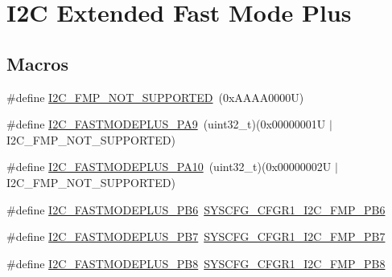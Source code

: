 \hypertarget{group___i2_c_ex___fast_mode_plus}{}\section{I2C Extended Fast Mode Plus}
\label{group___i2_c_ex___fast_mode_plus}
\subsection*{Macros}
\begin{DoxyCompactItemize}
\item 
\#define \hyperlink{group___i2_c_ex___fast_mode_plus_ga3a3da061fa78faa209f0feb39e20ef43}{I2\+C\+\_\+\+F\+M\+P\+\_\+\+N\+O\+T\+\_\+\+S\+U\+P\+P\+O\+R\+T\+ED}~(0x\+A\+A\+A\+A0000\+U)
\item 
\#define \hyperlink{group___i2_c_ex___fast_mode_plus_ga2e335d4993c228bb7aa778890e29ce57}{I2\+C\+\_\+\+F\+A\+S\+T\+M\+O\+D\+E\+P\+L\+U\+S\+\_\+\+P\+A9}~(uint32\+\_\+t)(0x00000001\+U $\vert$ I2\+C\+\_\+\+F\+M\+P\+\_\+\+N\+O\+T\+\_\+\+S\+U\+P\+P\+O\+R\+T\+E\+D)
\item 
\#define \hyperlink{group___i2_c_ex___fast_mode_plus_gacef0dcd4551b31cb585fa7e7044a50da}{I2\+C\+\_\+\+F\+A\+S\+T\+M\+O\+D\+E\+P\+L\+U\+S\+\_\+\+P\+A10}~(uint32\+\_\+t)(0x00000002\+U $\vert$ I2\+C\+\_\+\+F\+M\+P\+\_\+\+N\+O\+T\+\_\+\+S\+U\+P\+P\+O\+R\+T\+E\+D)
\item 
\#define \hyperlink{group___i2_c_ex___fast_mode_plus_ga9b3b77b0f00f09ee6d272d70dd5663f5}{I2\+C\+\_\+\+F\+A\+S\+T\+M\+O\+D\+E\+P\+L\+U\+S\+\_\+\+P\+B6}~\hyperlink{group___peripheral___registers___bits___definition_ga60cd7909ee96ba91280daff7fac4f76a}{S\+Y\+S\+C\+F\+G\+\_\+\+C\+F\+G\+R1\+\_\+\+I2\+C\+\_\+\+F\+M\+P\+\_\+\+P\+B6}
\item 
\#define \hyperlink{group___i2_c_ex___fast_mode_plus_gaaa6d3f6c1d635a2f5e4dbe2ef66ce1c3}{I2\+C\+\_\+\+F\+A\+S\+T\+M\+O\+D\+E\+P\+L\+U\+S\+\_\+\+P\+B7}~\hyperlink{group___peripheral___registers___bits___definition_ga65a2cd1a2a0ef7012e87fa06c5e8cb05}{S\+Y\+S\+C\+F\+G\+\_\+\+C\+F\+G\+R1\+\_\+\+I2\+C\+\_\+\+F\+M\+P\+\_\+\+P\+B7}
\item 
\#define \hyperlink{group___i2_c_ex___fast_mode_plus_gaf8d6aa219f041b552b3d3cd53cb78a26}{I2\+C\+\_\+\+F\+A\+S\+T\+M\+O\+D\+E\+P\+L\+U\+S\+\_\+\+P\+B8}~\hyperlink{group___peripheral___registers___bits___definition_ga8df0fd48121dfd545c2e005da130d867}{S\+Y\+S\+C\+F\+G\+\_\+\+C\+F\+G\+R1\+\_\+\+I2\+C\+\_\+\+F\+M\+P\+\_\+\+P\+B8}
\item 

\end{DoxyCompactItemize}
